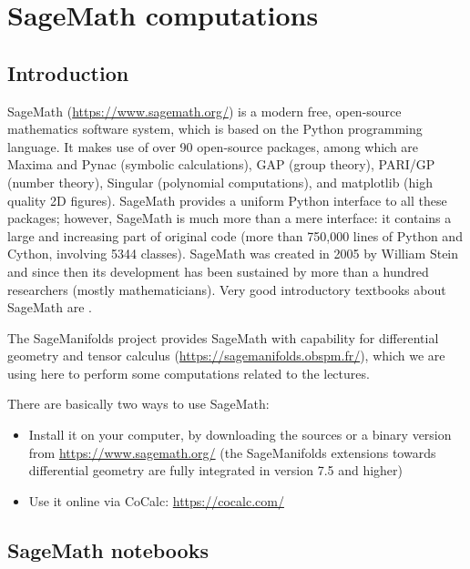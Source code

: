 \chapter{SageMath computations} \label{s:sam}

\minitoc

\section{Introduction}


\textsf{SageMath} (\url{https://www.sagemath.org/}) is a modern free,
open-source mathematics software system, which is
based on the Python programming language. It makes use of over 90 open-source packages,
among which are \textsf{Maxima} and \textsf{Pynac} (symbolic calculations),
\textsf{GAP} (group theory),
\textsf{PARI/GP} (number theory), \textsf{Singular} (polynomial computations),
and \textsf{matplotlib} (high quality 2D figures).
\textsf{SageMath} provides a uniform Python interface to all these packages; however,
\textsf{SageMath} is much more than a mere interface: it contains a large and increasing part of
original code (more than 750,000 lines of Python and Cython, involving 5344 classes).
\textsf{SageMath} was created in 2005 by William Stein \cite{SteinJ05} and since
then its development has been sustained by more than a hundred researchers
(mostly mathematicians). Very good introductory textbooks about \textsf{SageMath} are
\cite{JoyneS14,Zimme13,Bard15}.

The \textsf{SageManifolds} project
provides \textsf{SageMath} with capability for differential geometry and tensor calculus
(\url{https://sagemanifolds.obspm.fr/}), which we are using here to perform
some computations related to the lectures.

There are basically two ways to use \textsf{SageMath}:
\begin{itemize}
\item Install it on your computer, by downloading the sources or a binary version
from \url{https://www.sagemath.org/} (the \textsf{SageManifolds} extensions towards
differential geometry are fully integrated in version 7.5 and higher)
\item Use it online via \textsf{CoCalc}: \url{https://cocalc.com/}
\end{itemize}

\section{SageMath notebooks} \label{s:sam:notebooks}

